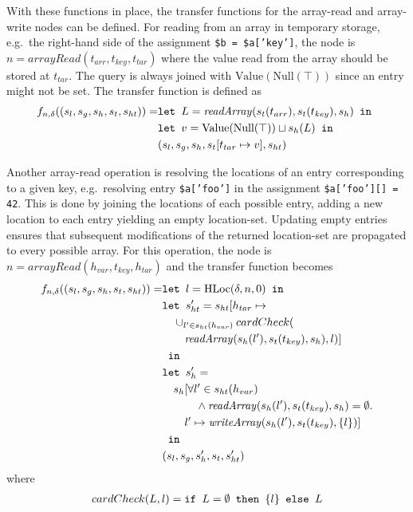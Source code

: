 With these functions in place, the transfer functions for the array-read and array-write nodes can be defined. For reading from an array in temporary storage, e.g.\ the right-hand side of the assignment \texttt{\$b = \$a['key']}, the node is $n = \mathit{arrayRead}(t_{arr},t_{key},t_{tar})$ where the value read from the array should be stored at $t_{tar}$. The query is always joined with $\text{Value}(\text{Null}(\top))$ since an entry might not be set. The transfer function is defined as
\begin{align}
f_{n,\delta}((s_l, s_g, s_h, s_t, s_{ht})) =   &\texttt{let } L = \mathit{readArray}(s_t(t_{arr}), s_t(t_{key}) ,s_h) \texttt{ in }\notag\\
                                    &\texttt{let } v = \text{Value}(\text{Null}(\top))\sqcup s_h(L) \texttt{ in }\notag\\
                                    &  (s_l, s_g, s_h, s_t[t_{tar}\mapsto v], s_{ht})
\end{align}

Another array-read operation is resolving the locations of an entry corresponding to a given key, e.g.\ resolving entry \texttt{\$a['foo']} in the assignment \texttt{\$a['foo'][] = 42}. This is done by joining the locations of each possible entry, adding a new location to each entry yielding an empty location-set. Updating empty entries ensures that subsequent modifications of the returned location-set are propagated to every possible array. For this operation, the node is $n = \mathit{arrayRead}(h_{var},t_{key},h_{tar})$ and the transfer function becomes
\begin{align}
f_{n,\delta}((s_l, s_g, s_h, s_t, s_{ht})) =   &\texttt{let } l = \text{HLoc}(\delta, n, 0) \texttt{ in }\notag\\
                                    &\texttt{let } s_{ht}' = s_{ht}[h_{tar} \mapsto \notag\\
                                    & \quad \cup_{l'\in s_{ht}(h_{var})}cardCheck(\notag\\
                                    &\quad\quad \mathit{readArray}(s_h(l'), s_t(t_{key}), s_h), l)]\notag\\
                                    & \texttt{ in }\notag\\
                                    &\texttt{let } s_h' = \notag\\
                                    &\quad s_h[\forall l' \in s_{ht}(h_{var}) \notag\\
                                    &\quad\quad\quad\wedge \mathit{readArray}(s_h(l'), s_t(t_{key}), s_h) = \emptyset.\notag\\
                                    &\quad\quad l' \mapsto \mathit{writeArray}(s_h(l'), s_t(t_{key}), \{l\})]\notag\\
                                    & \texttt{ in }\notag\\
                                    &(s_l, s_g, s_h', s_t, s_{ht}')
\end{align}
where 
\begin{align}
cardCheck(L, l) = \texttt{if }L = \emptyset\texttt{ then } \{l\} \texttt{ else } L
\end{align}

